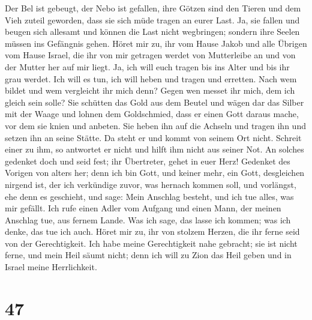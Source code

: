  Der Bel ist gebeugt, der Nebo ist gefallen, ihre Götzen
sind den Tieren und dem Vieh zuteil geworden, dass sie sich müde tragen
an eurer Last.  Ja, sie fallen und beugen sich allesamt
und können die Last nicht wegbringen; sondern ihre Seelen müssen ins
Gefängnis gehen.  Höret mir zu, ihr vom Hause Jakob und
alle Übrigen vom Hause Israel, die ihr von mir getragen werdet von
Mutterleibe an und von der Mutter her auf mir liegt.  Ja,
ich will euch tragen bis ins Alter und bis ihr grau werdet. Ich will es
tun, ich will heben und tragen und erretten.  Nach wem
bildet und wem vergleicht ihr mich denn? Gegen wen messet ihr mich, dem
ich gleich sein solle?  Sie schütten das Gold aus dem
Beutel und wägen dar das Silber mit der Waage und lohnen dem
Goldschmied, dass er einen Gott daraus mache, vor dem sie knien und
anbeten.  Sie heben ihn auf die Achseln und tragen ihn und
setzen ihn an seine Stätte. Da steht er und kommt von seinem Ort nicht.
Schreit einer zu ihm, so antwortet er nicht und hilft ihm nicht aus
seiner Not.  An solches gedenket doch und seid fest; ihr
Übertreter, gehet in euer Herz!  Gedenket des Vorigen von
alters her; denn ich bin Gott, und keiner mehr, ein Gott, desgleichen
nirgend ist,  der ich verkündige zuvor, was hernach
kommen soll, und vorlängst, ehe denn es geschieht, und sage: Mein
Anschlag besteht, und ich tue alles, was mir gefällt. 
Ich rufe einen Adler vom Aufgang und einen Mann, der meinen Anschlag
tue, aus fernem Lande. Was ich sage, das lasse ich kommen; was ich
denke, das tue ich auch.  Höret mir zu, ihr von stolzem
Herzen, die ihr ferne seid von der Gerechtigkeit.  Ich
habe meine Gerechtigkeit nahe gebracht; sie ist nicht ferne, und mein
Heil säumt nicht; denn ich will zu Zion das Heil geben und in Israel
meine Herrlichkeit.

\hypertarget{section-46}{%
\section{47}\label{section-46}}

